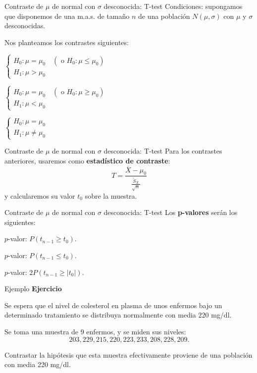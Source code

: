 \documentclass[
  ignorenonframetext,
]{beamer}
\begin{document}
\begin{frame}{Contraste de \(\mu\) de normal con \(\sigma\) desconocida:
T-test}
\protect\hypertarget{contraste-de-mu-de-normal-con-sigma-desconocida-t-test}{}
Condiciones: supongamos que disponemos de una m.a.s. de tamaño \(n\) de
una población \(N(\mu,\sigma)\) con \(\mu\) y \(\sigma\) desconocidas.

Nos planteamos los contrastes siguientes:

\(\left\{\begin{array}{l} H_0:\mu=\mu_0 \quad (\mbox{ o } H_0:\mu\leq \mu_0)\\ H_1:\mu>\mu_0 \end{array} \right.\)

\(\left\{\begin{array}{l} H_0:\mu=\mu_0 \quad (\mbox{ o } H_0:\mu\geq \mu_0)\\ H_1:\mu<\mu_0 \end{array} \right.\)

\(\left\{\begin{array}{l} H_0:\mu=\mu_0 \\ H_1:\mu \neq \mu_0 \end{array} \right.\)
\end{frame}

\begin{frame}{Contraste de \(\mu\) de normal con \(\sigma\) desconocida:
T-test}
\protect\hypertarget{contraste-de-mu-de-normal-con-sigma-desconocida-t-test-1}{}
Para los contrastes anteriores, usaremos como \textbf{estadístico de
contraste}: \[
T= \frac{\overline{X}-\mu_0}{\frac{\widetilde{S}_X}{\sqrt{n}}}
\] y calcularemos su valor \(t_0\) sobre la muestra.
\end{frame}

\begin{frame}{Contraste de \(\mu\) de normal con \(\sigma\) desconocida:
T-test}
\protect\hypertarget{contraste-de-mu-de-normal-con-sigma-desconocida-t-test-2}{}
Los \textbf{p-valores} serán los siguientes:

\(p\)-valor: \(P(t_{n-1}\geq t_0)\).

\(p\)-valor: \(P(t_{n-1}\leq t_0)\).

\(p\)-valor: \(2P(t_{n-1}\geq |t_0|)\).
\end{frame}

\begin{frame}{Ejemplo}
\protect\hypertarget{ejemplo-9}{}
\textbf{Ejercicio}

Se espera que el nivel de colesterol en plasma de unos enfermos bajo un
determinado tratamiento se distribuya normalmente con media 220 mg/dl.

Se toma una muestra de 9 enfermos, y se miden sus niveles: \[ 
203, 229, 215, 220, 223, 233, 208, 228, 209.
\]

Contrastar la hipótesis que esta muestra efectivamente proviene de una
población con media 220 mg/dl.
\end{frame}
\end{document}
